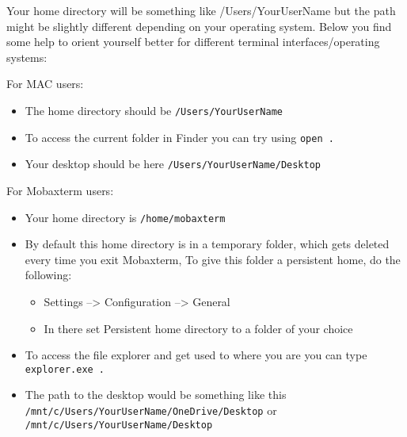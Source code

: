 \documentclass[
  letterpaper,
  DIV=11,
  numbers=noendperiod]{scrreprt}
\providecommand{\tightlist}{%
  \setlength{\itemsep}{0pt}\setlength{\parskip}{0pt}}\usepackage{longtable,booktabs,array}
\begin{document}
\begin{tcolorbox}[enhanced jigsaw, rightrule=.15mm, colbacktitle=quarto-callout-tip-color!10!white, colframe=quarto-callout-tip-color-frame, colback=white, arc=.35mm, opacitybacktitle=0.6, coltitle=black, bottomtitle=1mm, breakable, bottomrule=.15mm, leftrule=.75mm, titlerule=0mm, title=\textcolor{quarto-callout-tip-color}{\faLightbulb}\hspace{0.5em}{Tip: finding the desktop on different user systems}, toprule=.15mm, toptitle=1mm, opacityback=0, left=2mm]

Your home directory will be something like /Users/YourUserName but the
path might be slightly different depending on your operating system.
Below you find some help to orient yourself better for different
terminal interfaces/operating systems:

For MAC users:

\begin{itemize}
\tightlist
\item
  The home directory should be \texttt{/Users/YourUserName}
\item
  To access the current folder in Finder you can try using
  \texttt{open\ .}
\item
  Your desktop should be here \texttt{/Users/YourUserName/Desktop}
\end{itemize}

For Mobaxterm users:

\begin{itemize}
\tightlist
\item
  Your home directory is \texttt{/home/mobaxterm}
\item
  By default this home directory is in a temporary folder, which gets
  deleted every time you exit Mobaxterm, To give this folder a
  persistent home, do the following:

  \begin{itemize}
  \tightlist
  \item
    Settings --\textgreater{} Configuration --\textgreater{} General
  \item
    In there set Persistent home directory to a folder of your choice
  \end{itemize}
\item
  To access the file explorer and get used to where you are you can type
  \texttt{explorer.exe\ .}
\item
  The path to the desktop would be something like this
  \texttt{/mnt/c/Users/YourUserName/OneDrive/Desktop} or
  \texttt{/mnt/c/Users/YourUserName/Desktop}
\end{itemize}


\end{tcolorbox}
\end{document}
